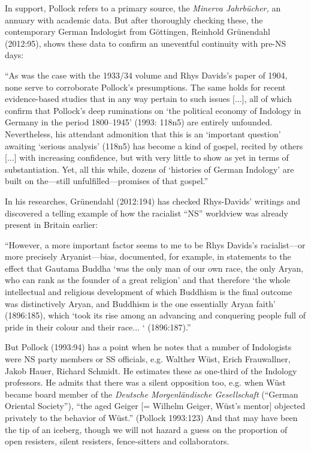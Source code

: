 In support, Pollock refers to a primary source, the {\sl Minerva Jahrbücher,} an annuary with academic data. But after thoroughly checking these, the contemporary German Indologist from Göttingen, Reinhold Grünendahl (2012:95), shows these data to confirm an uneventful continuity with pre-NS days: 
\smallskip

\begin{myquote}
“As was the case with the 1933/34 volume and Rhys Davids’s paper of 1904, none serve to corroborate Pollock’s presumptions. The same holds for recent evidence-based studies that in any way pertain to such issues [$\ldots$], all of which confirm that Pollock’s deep ruminations on ‘the political economy of Indology in Germany in the period 1800–1945’ (1993: 118n5) are entirely unfounded. Nevertheless, his attendant admonition that this is an ‘important question’ awaiting ‘serious analysis’ (118n5) has become a kind of gospel, recited by others [$\ldots$] with increasing confidence, but with very little to show as yet in terms of substantiation. Yet, all this while, dozens of ‘histories of German Indology’ are built on the—still unfulfilled—promises of that gospel.”
\end{myquote}
\smallskip

In his researches, Grünendahl (2012:194) has checked Rhys-Davids’ writings and discovered a telling example of how the racialist “NS” worldview was already present in Britain earlier:
\smallskip

\begin{myquote}
“However, a more important factor seems to me to be Rhys Davids’s racialist—or more precisely Aryanist—bias, documented, for example, in statements to the effect that Gautama Buddha ‘was the only man of our own race, the only Aryan, who can rank as the founder of a great religion’ and that therefore ‘the whole intellectual and religious development of which Buddhism is the final outcome was distinctively Aryan, and Buddhism is the one essentially Aryan faith’ (1896:185), which ‘took its rise among an advancing and conquering people full of pride in their colour and their race$\ldots$  ‘ (1896:187).”
\end{myquote}
\smallskip

But Pollock (1993:94) has a point when he notes that a number of Indologists were NS party members or SS officials, e.g. Walther Wüst, Erich Frauwallner, Jakob Hauer, Richard Schmidt. He estimates these as one-third of the Indology professors. He admits that there was a silent opposition too, e.g. when Wüst became board member of the {\sl Deutsche Morgenländische Gesellschaft} (“German Oriental Society”), “the aged Geiger [= Wilhelm Geiger, Wüst’s mentor] objected privately to the behavior of Wüst.” (Pollock 1993:123) And that may have been the tip of an iceberg, though we will not hazard a guess on the proportion of open resisters, silent resisters, fence-sitters and collaborators.

